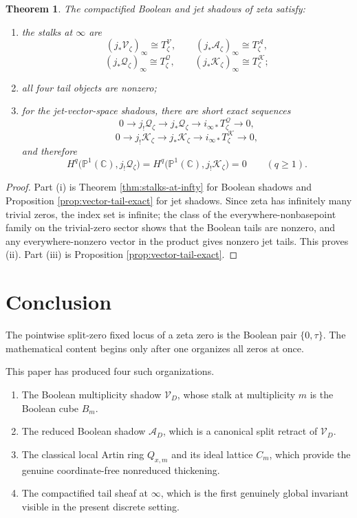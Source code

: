 \documentclass[11pt,a4paper]{article}
\newtheorem{theorem}{Theorem}[section]
\theoremstyle{definition}
\theoremstyle{remark}
\newcommand{\CC}{\mathbb C}
\newcommand{\PP}{\mathbb P}
\newcommand{\cV}{\mathcal V}
\newcommand{\cA}{\mathcal A}
\newcommand{\cQ}{\mathcal Q}
\newcommand{\cK}{\mathcal K}
\newcommand{\taup}{\tau}
\begin{document}
\begin{theorem}\label{thm:zeta-tail}
The compactified Boolean and jet shadows of zeta satisfy:
\begin{enumerate}[label=(\roman*)]
\item the stalks at $\infty$ are
\[
(j_*\cV_\zeta)_\infty\cong T_\zeta^{\cV},
\qquad
(j_*\cA_\zeta)_\infty\cong T_\zeta^{\cA},
\]
\[
(j_*\cQ_\zeta)_\infty\cong T_\zeta^{\cQ},
\qquad
(j_*\cK_\zeta)_\infty\cong T_\zeta^{\cK};
\]
\item all four tail objects are nonzero;
\item for the jet-vector-space shadows, there are short exact sequences
\[
0\to j_!\cQ_\zeta\to j_*\cQ_\zeta\to i_{\infty*}T_\zeta^{\cQ}\to0,
\]
\[
0\to j_!\cK_\zeta\to j_*\cK_\zeta\to i_{\infty*}T_\zeta^{\cK}\to0,
\]
and therefore
\[
H^q\bigl(\PP^1(\CC),j_!\cQ_\zeta\bigr)=H^q\bigl(\PP^1(\CC),j_!\cK_\zeta\bigr)=0
\qquad(q\ge1).
\]
\end{enumerate}
\end{theorem}

\begin{proof}
Part (i) is Theorem \ref{thm:stalks-at-infty} for Boolean shadows and Proposition \ref{prop:vector-tail-exact} for jet shadows.  Since zeta has infinitely many trivial zeros, the index set is infinite; the class of the everywhere-nonbasepoint family on the trivial-zero sector shows that the Boolean tails are nonzero, and any everywhere-nonzero vector in the product gives nonzero jet tails.  This proves (ii).  Part (iii) is Proposition \ref{prop:vector-tail-exact}.
\end{proof}

\section{Conclusion}

The pointwise split-zero fixed locus of a zeta zero is the Boolean pair $\{0,\taup\}$.  The mathematical content begins only after one organizes all zeros at once.

This paper has produced four such organizations.

\begin{enumerate}[label=(\roman*)]
\item The Boolean multiplicity shadow $\cV_D$, whose stalk at multiplicity $m$ is the Boolean cube $B_m$.
\item The reduced Boolean shadow $\cA_D$, which is a canonical split retract of $\cV_D$.
\item The classical local Artin ring $Q_{x,m}$ and its ideal lattice $C_m$, which provide the genuine coordinate-free nonreduced thickening.
\item The compactified tail sheaf at $\infty$, which is the first genuinely global invariant visible in the present discrete setting.
\end{enumerate}
\end{document}
